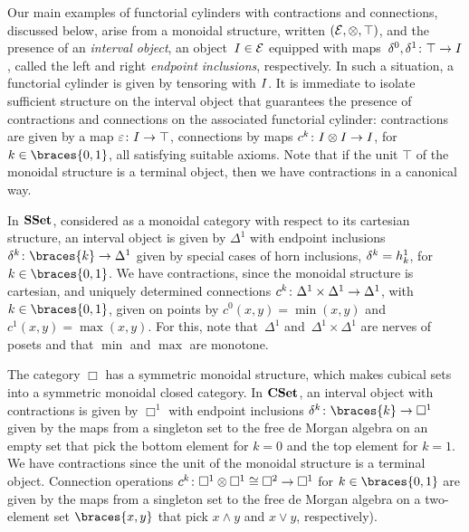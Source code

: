 \documentclass[reqno,10pt,a4paper,oneside,draft]{amsart}
\begin{document}
Our main examples of functorial cylinders with  contractions and connections, discussed below, arise from a monoidal
structure, written $(\mathcal{E}, \otimes, \top)$, and the presence of an \emph{interval object}, \ie an object~$I \in \mathcal{E}$ 
equipped with maps~$\delta^0, \delta^1 \colon \top \to I$, called the left 
and right \emph{endpoint inclusions}, respectively. In such a situation, a functorial cylinder is given by tensoring with $I$. 
It is  immediate to isolate sufficient structure on the interval object that guarantees the presence of contractions and connections on the associated functorial cylinder: 
contractions are given by a map $\varepsilon \colon I \to \top$, connections by maps $c^k \colon I \otimes I \to I$, for $k \in \braces{0, 1}$, 
all satisfying suitable axioms. Note that if the unit $\top$ of the monoidal structure is a terminal object, then we have contractions in a canonical way.





\begin{example} \label{exa:cyl-in-sset}
In $\mathbf{SSet}$, considered as a monoidal category with respect to its cartesian structure, 
an interval object is given by $\Delta^1$ with endpoint inclusions~$\kcyl  \co \braces{k} \to \Delta^1$ given 
by special cases of horn inclusions, $\delta^k = h^1_k$, for $k \in \braces{ 0, 1}$. We have contractions, since the monoidal structure is cartesian,
and uniquely determined connections $c^k \colon \Delta^1 \times \Delta^1 \to \Delta^1$, with $k \in \braces{0, 1}$, given on points by 
$c^0(x, y) = \min(x, y)$ and $c^1(x, y) = \max(x, y)$.
For this, note that~$\Delta^1$ and~$\Delta^1 \times \Delta^1$ are nerves of posets and that $\min$ and $\max$ are monotone.
\end{example}

\begin{example} \label{exa:cyl-in-cuset}
The category $\Box$ has a symmetric monoidal structure, which makes cubical sets into a symmetric monoidal closed category.
In $\mathbf{CSet}$, an interval object with contractions is given by $\Box^1$ with endpoint inclusions $\kcyl \co \braces{k} \to \Box^1$  given by the maps from a singleton set to the free de Morgan algebra 
on an empty set that pick the bottom element for $k = 0$ and the top element for $k =1$.
We have contractions since the unit of the monoidal structure  is a terminal object. 
Connection operations $c^k \colon \Box^1 \otimes \Box^1 \cong \Box^2 \to \Box^1$ for $k \in \braces{0, 1}$ are 
 given by the maps from a singleton set to the free de Morgan algebra on a two-element set $\braces{x, y}$ that pick $x \wedge y$ and $x \vee y$, respectively).
\end{example}
\end{document}
